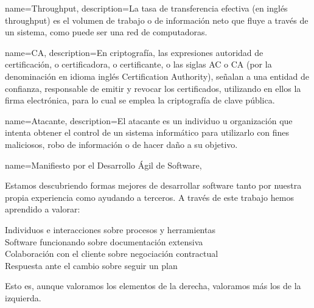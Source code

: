 {
    name=Throughput,
    description={La tasa de transferencia efectiva (en inglés throughput) es el volumen de trabajo o de información neto que fluye a través de
    un sistema, como puede ser una red de computadoras.}~\cite[Wikipedia]{wiki:throughput}
}

{
    name=CA,
    description={En criptografía, las expresiones autoridad de certificación, o certificadora, o certificante, o las siglas AC o CA (por la
    denominación en idioma inglés Certification Authority), señalan a una entidad de confianza, responsable de emitir y revocar los certificados,
    utilizando en ellos la firma electrónica, para lo cual se emplea la criptografía de clave pública.~\cite[Wikipedia]{wiki:ca}}
}

{
    name=Atacante,
    description={El atacante es un individuo u organización que intenta obtener el control de un sistema informático para utilizarlo con fines
    maliciosos, robo de información o de hacer daño a su objetivo.~\cite[Wikipedia]{wiki:atacante}}
}

{
    name={Manifiesto por el Desarrollo Ágil de Software},
  }
{
    \par Estamos descubriendo formas mejores de desarrollar software tanto por nuestra propia experiencia como ayudando a terceros. A través de este trabajo hemos aprendido a valorar:
    \par {\Large Individuos e interacciones} sobre procesos y herramientas\\
    {\Large Software funcionando} sobre documentación extensiva\\
    {\Large Colaboración con el cliente} sobre negociación contractual\\
    {\Large Respuesta ante el cambio} sobre seguir un plan
    \par Esto es, aunque valoramos los elementos de la derecha, valoramos más los de la izquierda.~\cite{ManifiestoAgil}
}


